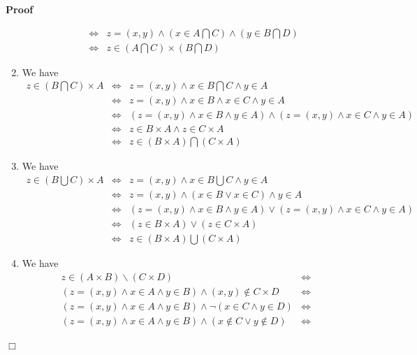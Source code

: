 \documentclass{book}
\newcommand{\nin}{\not\in}
\newenvironment{proof}{\noindent\textbf{Proof\ }}{\hspace*{\fill}$\Box$\medskip}
\begin{document}
\begin{proof}
\begin{enumerate}
\begin{eqnarray*}
      & \Leftrightarrow & z = (x, y) \wedge \left( x \in A \bigcap C \right)
      \wedge \left( y \in B \bigcap D \right)\\
      & \Leftrightarrow & z \in \left( A \bigcap C \right) \times \left( B
      \bigcap D \right)
    \end{eqnarray*}
    \item We have
    \begin{eqnarray*}
      z \in \left( B \bigcap C \right) \times A & \Leftrightarrow & z = (x, y)
      \wedge x \in B \bigcap C \wedge y \in A\\
      & \Leftrightarrow & z = (x, y) \wedge x \in B \wedge x \in C \wedge y
      \in A\\
      & \Leftrightarrow & (z = (x, y) \wedge x \in B \wedge y \in A) \wedge
      (z = (x, y) \wedge x \in C \wedge y \in A)\\
      & \Leftrightarrow & z \in B \times A \wedge z \in C \times A\\
      & \Leftrightarrow & z \in (B \times A) \bigcap (C \times A)
    \end{eqnarray*}
    \item We have
    \begin{eqnarray*}
      z \in \left( B \bigcup C \right) \times A & \Leftrightarrow & z = (x, y)
      \wedge x \in B \bigcup C \wedge y \in A\\
      & \Leftrightarrow & z = (x, y) \wedge (x \in B \vee x \in C) \wedge y
      \in A\\
      & \Leftrightarrow & (z = (x, y) \wedge x \in B \wedge y \in A) \vee (z
      = (x, y) \wedge x \in C \wedge y \in A)\\
      & \Leftrightarrow & (z \in B \times A) \vee (z \in C \times A)\\
      & \Leftrightarrow & z \in (B \times A) \bigcup (C \times A)
    \end{eqnarray*}
    \item We have
    \begin{eqnarray*}
      z \in (A \times B) \backslash (C \times D) & \Leftrightarrow & \\
      (z = (x, y) \wedge x \in A \wedge y \in B) \wedge (x, y) \nin C \times D
      & \Leftrightarrow & \\
      (z = (x, y) \wedge x \in A \wedge y \in B) \wedge \neg (x \in C \wedge y
      \in D) & \Leftrightarrow & \\
      (z = (x, y) \wedge x \in A \wedge y \in B) \wedge (x \nin C \vee y \nin
      D) & \Leftrightarrow & \\

\end{eqnarray*}
\end{enumerate}
\end{proof}
\end{document}
